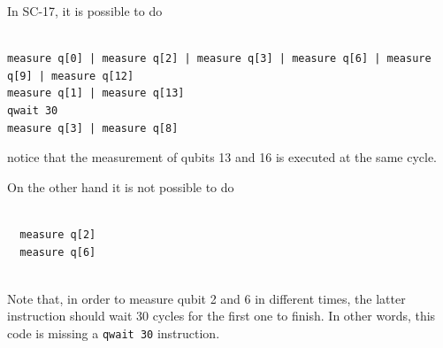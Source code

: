 \begin{minipage}[t]{.45\textwidth}

In SC-17, it is possible to do

\begin{verbatim}
  
measure q[0] | measure q[2] | measure q[3] | measure q[6] | measure q[9] | measure q[12]
measure q[1] | measure q[13]
qwait 30
measure q[3] | measure q[8]

\end{verbatim}

notice that the measurement of qubits 13 and 16 is executed at the same cycle.     

\end{minipage}
\hfill %
\begin{minipage}[t]{.45\textwidth}

On the other hand it is not possible to do

\begin{verbatim}
  
  measure q[2]
  measure q[6]
  
\end{verbatim}

Note that, in order to measure qubit 2 and 6 in different times, the latter instruction should wait 30 cycles for the first one to finish. In other words, this code is missing a \texttt{qwait 30} instruction.

\end{minipage}
